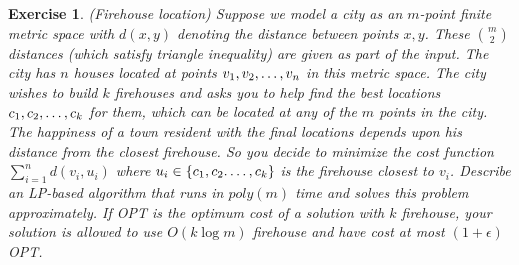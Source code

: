 \documentclass[12pt]{article}
\theoremstyle{colon}
\newtheorem{exercise}{Exercise}
\begin{document}
\begin{exercise}
  (Firehouse location) Suppose we model a city as an $m$-point finite metric space with $d(x,y)$ denoting the distance between points $x, y$. These $\binom{m}{2}$ distances (which satisfy triangle inequality) are given as part of the input. The city has $n$ houses located at points $v_1, v_2, \mathellipsis, v_n$ in this metric space. The city wishes to build $k$ firehouses and asks you to help find the best locations $c_1, c_2, \mathellipsis, c_k$ for them, which can be located at any of the $m$ points in the city. The \textit{happiness} of a town resident with the final locations depends upon his distance from the closest firehouse. So you decide to minimize the cost function $\sum_{i=1}^n d(v_i,u_i)$ where $u_i \in \{ c_1, c_2. \mathellipsis, c_k \}$ is the firehouse closest to $v_i$. Describe an LP-based algorithm that runs in $poly(m)$ time and solves this problem approximately. If OPT is the optimum cost of a solution with $k$ firehouse, your solution is allowed to use $O(k \log m)$ firehouse and have cost at most $(1+\epsilon)$OPT.
\end{exercise}
\end{document}
